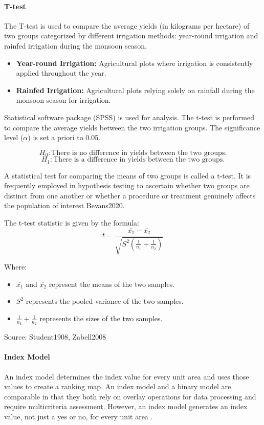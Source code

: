 \paragraph{T-test}
The T-test is used to compare the average yields (in kilograms per hectare) of two groups categorized by different irrigation methods: year-round irrigation and rainfed irrigation during the monsoon season.

\begin{itemize}
    \item \textbf{Year-round Irrigation:} Agricultural plots where irrigation is consistently applied throughout the year.
    \item \textbf{Rainfed Irrigation:} Agricultural plots relying solely on rainfall during the monsoon season for irrigation.
\end{itemize}

Statistical software package (SPSS) is used for analysis. The t-test is performed to compare the average yields between the two irrigation groups. The significance level ($\alpha$) is set a priori to 0.05.

\[
H_0: \text{There is no difference in yields between the two groups.}
\]
\[
H_1: \text{There is a difference in yields between the two groups.}
\]

A statistical test for comparing the means of two groups is called a t-test. It is frequently employed in hypothesis testing to ascertain whether two groups are distinct from one another or whether a procedure or treatment genuinely affects the population of interest Bevans2020.

The t-test statistic is given by the formula:
\[
t = \frac{\overline{x_1} - \overline{x_2}}{\sqrt{S^2 \left( \frac{1}{n_1} + \frac{1}{n_2} \right)}}
\]

Where:
\begin{itemize}
    \item $\overline{x_1}$ and $\overline{x_2}$ represent the means of the two samples.
    \item $S^2$ represents the pooled variance of the two samples.
    \item $\frac{1}{n_1} + \frac{1}{n_2}$ represents the sizes of the two samples.
\end{itemize}

Source: Student1908, Zabell2008

\paragraph{Index Model}
An index model determines the index value for every unit area and uses those values to create a ranking map. An index model and a binary model are comparable in that they both rely on overlay operations for data processing and require multicriteria assessment. However, an index model generates an index value, not just a yes or no, for every unit area \cite{OneStopGIS2020}.

